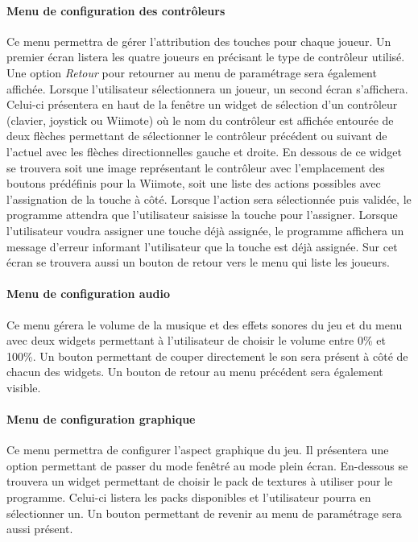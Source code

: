 \paragraph{Menu de configuration des contrôleurs}

Ce menu permettra de gérer l'attribution des touches pour chaque joueur. Un premier écran listera les quatre joueurs en précisant le type de contrôleur utilisé. Une option \emph{Retour} pour retourner au menu de paramétrage sera également affichée. Lorsque l'utilisateur sélectionnera un joueur, un second écran s'affichera. Celui-ci présentera en haut de la fenêtre un widget de sélection d'un contrôleur (clavier, joystick ou Wiimote) où le nom du contrôleur est affichée entourée de deux flèches permettant de sélectionner le contrôleur précédent ou suivant de l'actuel avec les flèches directionnelles gauche et droite. En dessous de ce widget se trouvera soit une image représentant le contrôleur avec l'emplacement des boutons prédéfinis pour la Wiimote, soit une liste des actions possibles avec l'assignation de la touche à côté. Lorsque l'action sera sélectionnée puis validée, le programme attendra que l'utilisateur saisisse la touche pour l'assigner. Lorsque l'utilisateur voudra assigner une touche déjà assignée, le programme affichera un message d'erreur informant l'utilisateur que la touche est déjà assignée. Sur cet écran se trouvera aussi un bouton de retour vers le menu qui liste les joueurs.

\paragraph{Menu de configuration audio}

Ce menu gérera le volume de la musique et des effets sonores du jeu et du menu avec deux widgets permettant à l'utilisateur de choisir le volume entre 0\% et 100\%. Un bouton permettant de couper directement le son sera présent à côté de chacun des widgets. Un bouton de retour au menu précédent sera également visible.

\paragraph{Menu de configuration graphique}

Ce menu permettra de configurer l'aspect graphique du jeu. Il présentera une option permettant de passer du mode fenêtré au mode plein écran. En-dessous se trouvera un widget permettant de choisir le pack de textures à utiliser pour le programme. Celui-ci listera les packs disponibles et l'utilisateur pourra en sélectionner un. Un bouton permettant de revenir au menu de paramétrage sera aussi présent.

